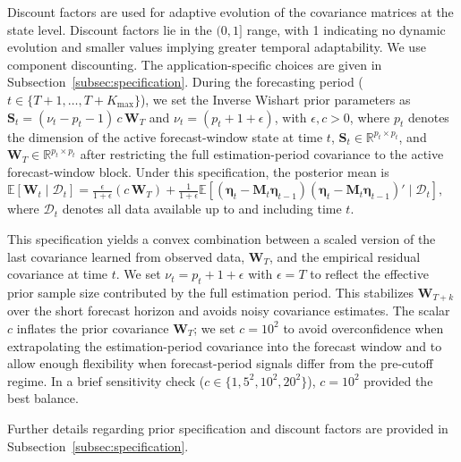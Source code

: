 \documentclass[APA,STIX1COL]{WileyNJD-v2}
\begin{document}
Discount factors \citep{prado2021time} are used for adaptive evolution of the covariance matrices at the state level. Discount factors lie in the $(0,1]$ range, with 1 indicating no dynamic evolution and smaller values implying greater temporal adaptability. We use component discounting. The application-specific choices are given in Subsection~\ref{subsec:specification}. During the forecasting period ($t \in \{T+1, \ldots, T+K_{\max}\}$), we set the Inverse Wishart prior parameters as $\mathbf{S}_t = (\nu_t - p_t - 1)\, c\, \mathbf{W}_T$ and $\nu_t = (p_t + 1 + \epsilon)$, with $\epsilon, c > 0$, where \(p_t\) denotes the dimension of the active forecast-window state at time \(t\), \(\mathbf{S}_t \in \mathbb{R}^{p_t\times p_t}\), and \(\mathbf{W}_T \in \mathbb{R}^{p_t\times p_t}\) after restricting the full estimation-period covariance to the active forecast-window block. Under this specification, the posterior mean is
\(
\mathbb{E}[\mathbf{W}_t \mid \mathcal{D}_t] = \frac{\epsilon}{1 + \epsilon}(c\, \mathbf{W}_T) + \frac{1}{1 + \epsilon} \mathbb{E}\left[ (\boldsymbol{\eta}_t - \mathbf{M}_t \boldsymbol{\eta}_{t-1}) (\boldsymbol{\eta}_t - \mathbf{M}_t \boldsymbol{\eta}_{t-1})' \mid \mathcal{D}_t \right],
\)
where $\mathcal{D}_t$ denotes all data available up to and including time $t$.

This specification yields a convex combination between a scaled version of the last covariance learned from observed data, $\mathbf{W}_T$, and the empirical residual covariance at time $t$. We set $\nu_t = p_t + 1 + \epsilon$ with $\epsilon = T$ to reflect the effective prior sample size contributed by the full estimation period. This stabilizes $\mathbf{W}_{T+k}$ over the short forecast horizon and avoids noisy covariance estimates. The scalar \(c\) inflates the prior covariance \(\mathbf{W}_T\); we set \(c = 10^2\) to avoid overconfidence when extrapolating the estimation-period covariance into the forecast window and to allow enough flexibility when forecast-period signals differ from the pre-cutoff regime. In a brief sensitivity check (\(c \in \{1,5^2,10^2,20^2\}\)), \(c=10^2\) provided the best balance.
 
Further details regarding prior specification and discount factors are provided in Subsection~\ref{subsec:specification}.
\end{document}
